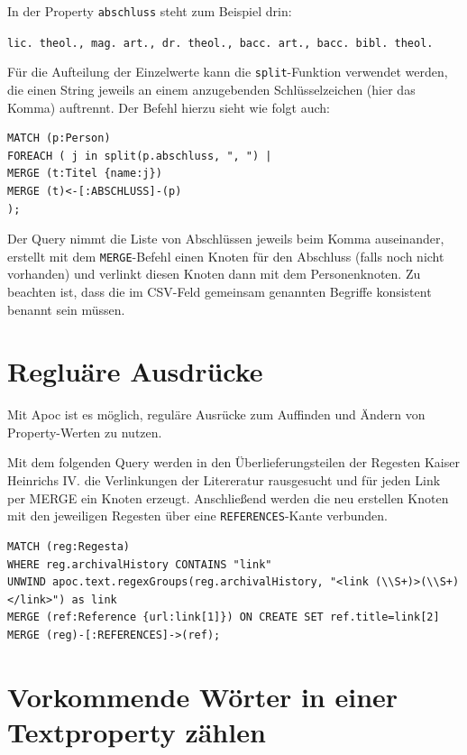 \documentclass[ngerman,]{scrreprt}
\begin{document}
In der Property \texttt{abschluss} steht zum Beispiel drin:

\texttt{lic.\ theol.,\ mag.\ art.,\ dr.\ theol.,\ bacc.\ art.,\ bacc.\ bibl.\ theol.}

Für die Aufteilung der Einzelwerte kann die \texttt{split}-Funktion verwendet werden, die einen String jeweils an einem anzugebenden Schlüsselzeichen (hier das Komma) auftrennt. Der Befehl hierzu sieht wie folgt auch:

\begin{verbatim}
MATCH (p:Person)
FOREACH ( j in split(p.abschluss, ", ") |
MERGE (t:Titel {name:j})
MERGE (t)<-[:ABSCHLUSS]-(p)
);
\end{verbatim}

Der Query nimmt die Liste von Abschlüssen jeweils beim Komma auseinander, erstellt mit dem \texttt{MERGE}-Befehl einen Knoten für den Abschluss (falls noch nicht vorhanden) und verlinkt diesen Knoten dann mit dem Personenknoten. Zu beachten ist, dass die im CSV-Feld gemeinsam genannten Begriffe konsistent benannt sein müssen.

\section{Regluäre Ausdrücke}\label{regluuxe4re-ausdruxfccke}

Mit Apoc ist es möglich, reguläre Ausrücke zum Auffinden und Ändern von Property-Werten zu nutzen.

Mit dem folgenden Query werden in den Überlieferungsteilen der Regesten Kaiser Heinrichs IV. die Verlinkungen der Litereratur rausgesucht und für jeden Link per MERGE ein Knoten erzeugt. Anschließend werden die neu erstellen Knoten mit den jeweiligen Regesten über eine \texttt{REFERENCES}-Kante verbunden.

\begin{verbatim}
MATCH (reg:Regesta)
WHERE reg.archivalHistory CONTAINS "link"
UNWIND apoc.text.regexGroups(reg.archivalHistory, "<link (\\S+)>(\\S+)</link>") as link
MERGE (ref:Reference {url:link[1]}) ON CREATE SET ref.title=link[2]
MERGE (reg)-[:REFERENCES]->(ref);
\end{verbatim}

\section{Vorkommende Wörter in einer Textproperty zählen}\label{vorkommende-wuxf6rter-in-einer-textproperty-zuxe4hlen}
\end{document}
